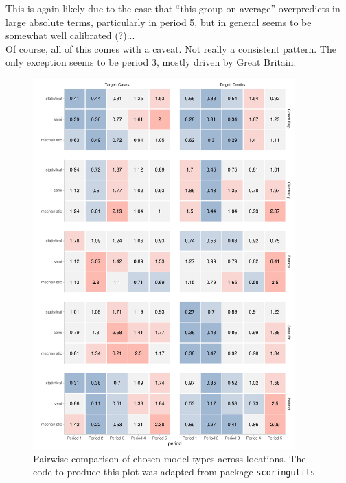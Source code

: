 This is again likely due to the case that ``this group on average'' overpredicts in large absolute terms, particularly in period 5, but in general seems to be somewhat well calibrated (?)...\\
Of course, all of this comes with a caveat. Not really a consistent pattern.
The only exception seems to be period 3, mostly driven by Great Britain.\\
\begin{figure}
\centering
\includegraphics[width = 0.9\textwidth]{../plots/pw_comp_model_types_across_periods_and_loc.pdf}
\caption{Pairwise comparison of chosen model types across locations. The code to produce this plot was adapted from package \texttt{scoringutils}}
\label{fig:pw_comp_modeltypes_byloc}
\end{figure}
